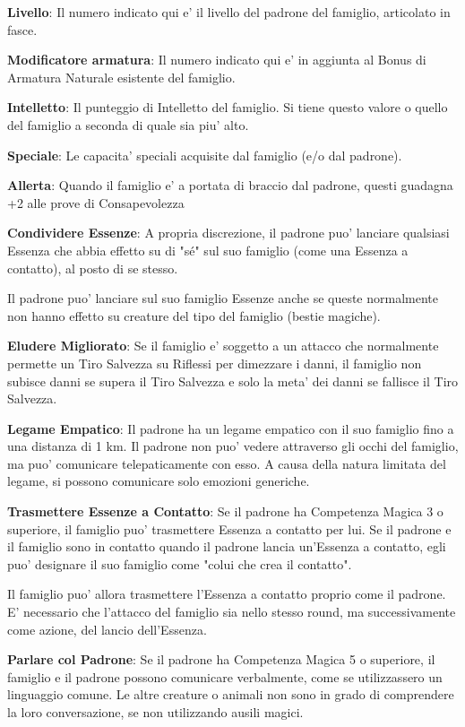 \documentclass[a4paper,11pt,twoside,openany]{book}
\begin{document}
\textbf{Livello}: Il numero indicato qui e' il livello del padrone del famiglio, articolato in fasce.

\textbf{Modificatore armatura}: Il numero indicato qui e' in aggiunta al Bonus di Armatura Naturale esistente del famiglio.

\textbf{Intelletto}: Il punteggio di Intelletto del famiglio. Si tiene questo valore o quello del famiglio a seconda di quale sia piu' alto. 

\textbf{Speciale}: Le capacita' speciali acquisite dal famiglio (e/o dal padrone).

\textbf{Allerta}: Quando il famiglio e' a portata di braccio dal padrone, questi guadagna +2 alle prove di Consapevolezza

\textbf{Condividere Essenze}: A propria discrezione, il padrone puo' lanciare qualsiasi Essenza che abbia effetto su di "sé" sul suo famiglio (come una Essenza a contatto), al posto di se stesso.

Il padrone puo' lanciare sul suo famiglio Essenze anche se queste normalmente non hanno effetto su creature del tipo del famiglio (bestie magiche).

\textbf{Eludere Migliorato}: Se il famiglio e' soggetto a un attacco che normalmente permette un Tiro Salvezza su Riflessi per dimezzare i danni, il famiglio non subisce danni se supera il Tiro Salvezza e solo la meta' dei danni se fallisce il Tiro Salvezza.

\textbf{Legame Empatico}: Il padrone ha un legame empatico con il suo famiglio fino a una distanza di 1 km. Il padrone non puo' vedere attraverso gli occhi del famiglio, ma puo' comunicare telepaticamente con esso. A causa della natura limitata del legame, si possono comunicare solo emozioni generiche.

\textbf{Trasmettere Essenze a Contatto}: Se il padrone ha Competenza Magica 3 o superiore, il famiglio puo' trasmettere Essenza a contatto per lui. Se il padrone e il famiglio sono in contatto quando il padrone lancia un'Essenza a contatto, egli puo' designare il suo famiglio come "colui che crea il contatto".

Il famiglio puo' allora trasmettere l'Essenza a contatto proprio come il padrone. E' necessario che l'attacco del famiglio sia nello stesso round, ma successivamente come azione, del lancio dell'Essenza.

\textbf{Parlare col Padrone}: Se il padrone ha Competenza Magica 5 o superiore, il famiglio e il padrone possono comunicare verbalmente, come se utilizzassero un linguaggio comune. Le altre creature o animali non sono in grado di comprendere la loro conversazione, se non utilizzando ausili magici.
\end{document}
